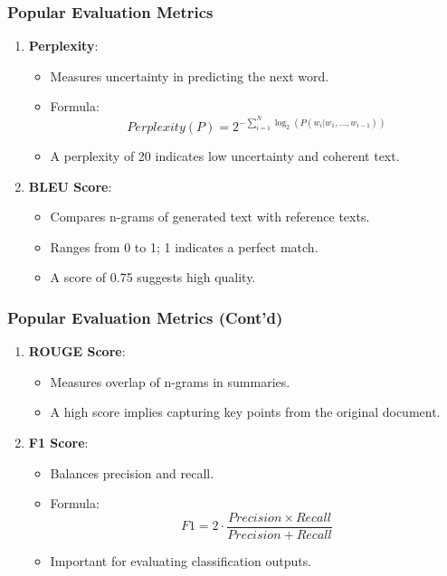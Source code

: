 \documentclass[aspectratio=169]{beamer}
\begin{document}
\begin{frame}[fragile]
    \frametitle{Popular Evaluation Metrics}
    \begin{enumerate}
        \item \textbf{Perplexity}:
            \begin{itemize}
                \item Measures uncertainty in predicting the next word.
                \item Formula: 
                \[
                Perplexity(P) = 2^{-\sum_{i=1}^{N} \log_2 (P(w_i | w_1, ..., w_{i-1}))}
                \]
                \item A perplexity of 20 indicates low uncertainty and coherent text.
            \end{itemize}
        
        \item \textbf{BLEU Score}:
            \begin{itemize}
                \item Compares n-grams of generated text with reference texts.
                \item Ranges from 0 to 1; 1 indicates a perfect match.
                \item A score of 0.75 suggests high quality.
            \end{itemize}
    \end{enumerate}
\end{frame}

\begin{frame}[fragile]
    \frametitle{Popular Evaluation Metrics (Cont'd)}
    \begin{enumerate}[resume]
        \item \textbf{ROUGE Score}:
            \begin{itemize}
                \item Measures overlap of n-grams in summaries.
                \item A high score implies capturing key points from the original document.
            \end{itemize}
        
        \item \textbf{F1 Score}:
            \begin{itemize}
                \item Balances precision and recall.
                \item Formula: 
                \[
                F1 = 2 \cdot \frac{Precision \times Recall}{Precision + Recall}
                \]
                \item Important for evaluating classification outputs.
            \end{itemize}
    \end{enumerate}
\end{frame}
\end{document}
